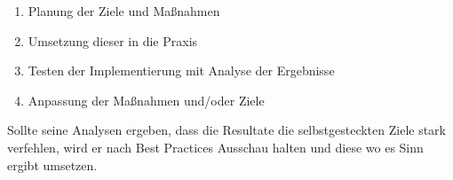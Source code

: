 \begin{enumerate}
\item Planung der Ziele und Maßnahmen
\item Umsetzung dieser in die Praxis
\item Testen der Implementierung mit Analyse der Ergebnisse
\item Anpassung der Maßnahmen und/oder Ziele
\end{enumerate}

Sollte seine Analysen ergeben, dass die Resultate die selbstgesteckten Ziele
stark verfehlen, wird er nach Best Practices Ausschau halten und diese
wo es Sinn ergibt umsetzen.
